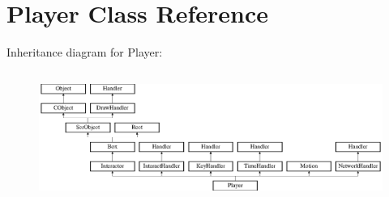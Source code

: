 \hypertarget{class_player}{}\section{Player Class Reference}
\label{class_player}
Inheritance diagram for Player\+:\begin{figure}[H]
\begin{center}
\leavevmode
\includegraphics[height=4.324325cm]{class_player}
\end{center}
\end{figure}
